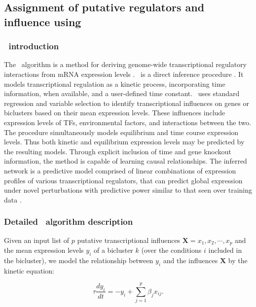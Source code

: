 \subsection{Assignment of putative regulators and influence using \nwinf}

\subsubsection{\nwinf\ introduction}

The \nwinf\ algorithm is a method for deriving genome-wide transcriptional regulatory interactions from mRNA expression levels \cite{bonneau_inferelator:_2006}. \nwinf\ is a direct inference procedure \cite{michoel_comparative_2009}. It models transcriptional regulation as a kinetic process, incorporating time information, when available, and a user-defined time constant. \nwinf\ uses standard regression and variable selection to identify transcriptional influences on genes or biclusters based on their mean expression levels. These influences include expression levels of TFs, environmental factors, and interactions between the two. The procedure simultaneously models equilibrium and time course expression levels. Thus both kinetic and equilibrium expression levels may be predicted by the resulting models. Through explicit inclusion of time and gene knockout information, the method is capable of learning causal relationships. The inferred network is a predictive model comprised of linear combinations of expression profiles of various transcriptional regulators, that can predict global expression under novel perturbations with predictive power similar to that seen over training data \cite{bonneau_inferelator:_2006}.

\subsubsection{Detailed \nwinf\ algorithm description}

Given an input list of $p$ putative transcriptional influences $\mathbf{X}={x_1,x_2,\cdots,x_p}$ and the mean expression levels $y_{i}$ of a bicluster $k$ (over the conditions $i$ included in the bicluster), we model the relationship between $y_{i}$ and the influences $\mathbf{X}$ by the kinetic equation:

\begin{equation}
\label{eq:nwinf:kinetic}
\tau\frac{dy_{i}}{dt}=-y_{i}+\sum_{j=1}^{p}\beta_j x_{ij} .
\end{equation}

